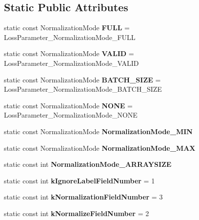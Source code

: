 \subsection*{Static Public Attributes}
\begin{DoxyCompactItemize}
\item 
\mbox{\label{classcaffe_1_1_loss_parameter_ab39fa24c3af248635d61c688230110dc}} 
static const Normalization\+Mode {\bfseries F\+U\+LL} = Loss\+Parameter\+\_\+\+Normalization\+Mode\+\_\+\+F\+U\+LL
\item 
\mbox{\label{classcaffe_1_1_loss_parameter_a907774d8b52969ecdfb023fe721020dc}} 
static const Normalization\+Mode {\bfseries V\+A\+L\+ID} = Loss\+Parameter\+\_\+\+Normalization\+Mode\+\_\+\+V\+A\+L\+ID
\item 
\mbox{\label{classcaffe_1_1_loss_parameter_a8bfebe6eebfcb461866013ec35592d89}} 
static const Normalization\+Mode {\bfseries B\+A\+T\+C\+H\+\_\+\+S\+I\+ZE} = Loss\+Parameter\+\_\+\+Normalization\+Mode\+\_\+\+B\+A\+T\+C\+H\+\_\+\+S\+I\+ZE
\item 
\mbox{\label{classcaffe_1_1_loss_parameter_afe99533876200b2653f0e7f33e1f30cf}} 
static const Normalization\+Mode {\bfseries N\+O\+NE} = Loss\+Parameter\+\_\+\+Normalization\+Mode\+\_\+\+N\+O\+NE
\item 
static const Normalization\+Mode {\bfseries Normalization\+Mode\+\_\+\+M\+IN}
\item 
static const Normalization\+Mode {\bfseries Normalization\+Mode\+\_\+\+M\+AX}
\item 
static const int {\bfseries Normalization\+Mode\+\_\+\+A\+R\+R\+A\+Y\+S\+I\+ZE}
\item 
\mbox{\label{classcaffe_1_1_loss_parameter_a83347618c8a131e1c58c1fef6cebd1e6}} 
static const int {\bfseries k\+Ignore\+Label\+Field\+Number} = 1
\item 
\mbox{\label{classcaffe_1_1_loss_parameter_a6cd3a9c8e4ea50849e4ba638772bb779}} 
static const int {\bfseries k\+Normalization\+Field\+Number} = 3
\item 
\mbox{\label{classcaffe_1_1_loss_parameter_af538cdffa1d4cd5b57f7df30399e1158}} 
static const int {\bfseries k\+Normalize\+Field\+Number} = 2
\end{DoxyCompactItemize}
